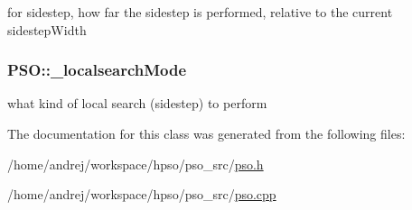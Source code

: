 for sidestep, how far the sidestep is performed, relative to the current sidestepWidth 

\hypertarget{classPSO_8e1a8e852e90de89cee28ad2e99ff048}{
\subsubsection{ {\bf PSO::\_\-localsearchMode}}}
\label{classPSO_8e1a8e852e90de89cee28ad2e99ff048}


what kind of local search (sidestep) to perform 



The documentation for this class was generated from the following files:\begin{CompactItemize}
\item 
/home/andrej/workspace/hpso/pso\_\-src/\hyperlink{pso_8h}{pso.h}\item 
/home/andrej/workspace/hpso/pso\_\-src/\hyperlink{pso_8cpp}{pso.cpp}\end{CompactItemize}
